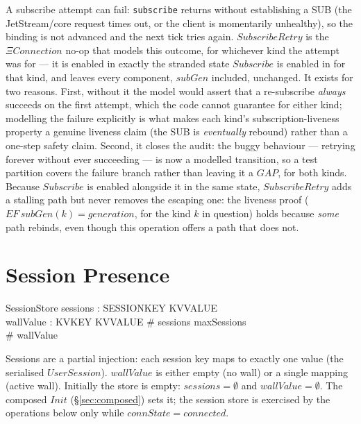 \documentclass[a4paper,10pt,fleqn]{article}
\begin{document}
A subscribe attempt can fail: \texttt{subscribe} returns without
establishing a SUB (the JetStream/core request times out, or the client
is momentarily unhealthy), so the binding is not advanced and the next
tick tries again.  $SubscribeRetry$ is the $\Xi Connection$ no-op that
models this outcome, for whichever kind the attempt was for --- it is
enabled in exactly the stranded state $Subscribe$ is enabled in for that
kind, and leaves every component, $subGen$ included, unchanged.  It
exists for two reasons.  First, without it the model would assert that a
re-subscribe \emph{always} succeeds on the first attempt, which the code
cannot guarantee for either kind; modelling the failure explicitly is
what makes each kind's subscription-liveness property a genuine liveness
claim (the SUB is \emph{eventually} rebound) rather than a one-step
safety claim.  Second, it closes the audit: the buggy behaviour ---
retrying forever without ever succeeding --- is now a modelled
transition, so a test partition covers the failure branch rather than
leaving it a $GAP$, for both kinds.  Because $Subscribe$ is enabled
alongside it in the same state, $SubscribeRetry$ adds a stalling path but
never removes the escaping one: the liveness proof ($EF\,subGen(k) =
generation$, for the kind $k$ in question) holds because \emph{some} path
rebinds, even though this operation offers a path that does not.

\section{Session Presence}

\begin{schema}{SessionStore}
  sessions : SESSIONKEY \pinj KVVALUE \\
  wallValue : KVKEY \pfun KVVALUE
  \where
  \# sessions \leq maxSessions \\
  \# wallValue 
\end{schema}

Sessions are a partial injection: each session key maps to
exactly one value (the serialised $UserSession$).  $wallValue$
is either empty (no wall) or a single mapping (active wall).
Initially the store is empty: $sessions = \emptyset$ and
$wallValue = \emptyset$.  The composed $Init$ (\S\ref{sec:composed}) sets it;
the session store is exercised by the operations below only while
$connState = connected$.
\end{document}
